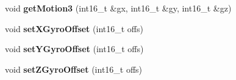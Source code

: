 \begin{DoxyCompactItemize}
\item 
\mbox{\label{classSensor_1_1ICM20689_af1f4e6609e5de2deca0e33d7aa99ebeb}} 
void {\bfseries get\+Motion3} (int16\+\_\+t \&gx, int16\+\_\+t \&gy, int16\+\_\+t \&gz)
\item 
\mbox{\label{classSensor_1_1ICM20689_ad6c428f1eb6de6c0048e4155029f622e}} 
void {\bfseries set\+X\+Gyro\+Offset} (int16\+\_\+t offs)
\item 
\mbox{\label{classSensor_1_1ICM20689_acdd86ac38500aea819474f7772e40ba4}} 
void {\bfseries set\+Y\+Gyro\+Offset} (int16\+\_\+t offs)
\item 
\mbox{\label{classSensor_1_1ICM20689_a7a81ceaa27a41caa6b27d16fd2368964}} 
void {\bfseries set\+Z\+Gyro\+Offset} (int16\+\_\+t offs)
\end{DoxyCompactItemize}
